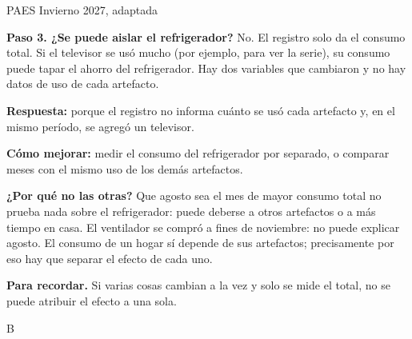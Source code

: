 \begin{elejemplo}{PAES Invierno 2027, adaptada}
{\textbf{Paso 3. ¿Se puede aislar el refrigerador?} No. El registro solo da el consumo total. Si el televisor se usó mucho (por ejemplo, para ver la serie), su consumo puede tapar el ahorro del refrigerador. Hay dos variables que cambiaron y no hay datos de uso de cada artefacto.

\textbf{Respuesta:} porque el registro no informa cuánto se usó cada artefacto y, en el mismo período, se agregó un televisor.

\textbf{Cómo mejorar:} medir el consumo del refrigerador por separado, o comparar meses con el mismo uso de los demás artefactos.

\textbf{¿Por qué no las otras?} Que agosto sea el mes de mayor consumo total no prueba nada sobre el refrigerador: puede deberse a otros artefactos o a más tiempo en casa. El ventilador se compró a fines de noviembre: no puede explicar agosto. El consumo de un hogar sí depende de sus artefactos; precisamente por eso hay que separar el efecto de cada uno.

\textbf{\color{cienciaD}Para recordar.} Si varias cosas cambian a la vez y solo se mide el total, no se puede atribuir el efecto a una sola.}{B}
\end{elejemplo}

